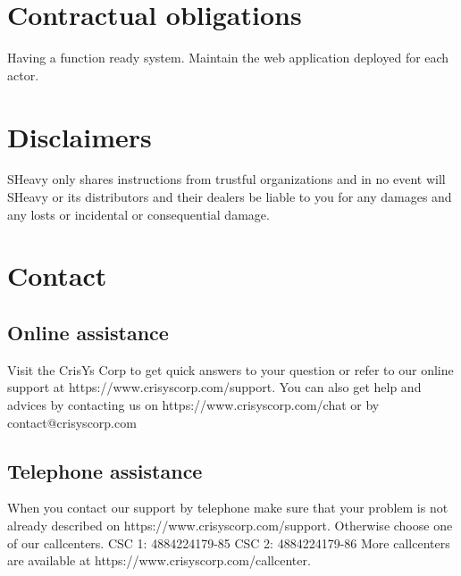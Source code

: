 \section{Contractual obligations}
Having a function ready system. Maintain the web application deployed for each
actor.

\section{Disclaimers}
SHeavy only shares instructions from trustful organizations and in no event
will SHeavy or its distributors and their dealers be liable to you for any
damages and any losts or incidental or consequential damage.

\section{Contact}

\subsection{Online assistance}
Visit the CrisYs Corp to get quick answers to your question or refer to our
online support at https://www.crisyscorp.com/support. You can also get help
and advices by contacting us on https://www.crisyscorp.com/chat or by
contact@crisyscorp.com

\subsection{Telephone assistance}
When you contact our support by telephone make sure that your problem is not already
described on https://www.crisyscorp.com/support. Otherwise choose one of our
callcenters.
CSC 1:  4884224179-85 
CSC 2:  4884224179-86  
More callcenters are available at https://www.crisyscorp.com/callcenter.

